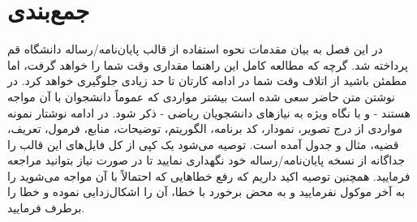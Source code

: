    \section{جمع‌بندی}
    در این فصل به بیان مقدمات نحوه استفاده از قالب پایان‌نامه/رساله دانشگاه قم پرداخته شد. 
    گرچه که مطالعه کامل این راهنما مقداری وقت شما را خواهد گرفت، اما مطمئن باشید از اتلاف وقت شما در ادامه کارتان تا حد زیادی جلوگیری خواهد کرد. 
    در نوشتن متن حاضر سعی شده است بیشتر مواردی که عموماً دانشجوان با آن مواجه هستند - و با نگاه ویژه به نیازهای دانشجویان ریاضی - ذکر شود. 
    در ادامه نوشتار نمونه مواردی از درج تصویر، نمودار، کد برنامه، الگوریتم، توضیحات، منابع، فرمول، تعریف، قضیه، مثال و جدول آمده است. 
    توصیه می‌شود یک کپی از کل فایل‌های این قالب را جداگانه از نسخه پایان‌نامه/رساله خود نگهداری نمایید تا در صورت نیاز بتوانید مراجعه فرمایید. 
    همچنین توصیه اکید داریم که رفع خطاهایی که احتمالاً با آن مواجه می‌شوید را به آخر موکول نفرمایید و به محض برخورد با خطا، آن را اشکال‌زدایی نموده و 
    خطا را برطرف فرمایید.
